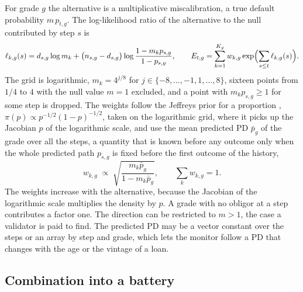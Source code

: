 For grade $g$ the alternative is a multiplicative miscalibration, a true default probability $m\,p_{t,g}$. The log-likelihood ratio of the alternative to the null contributed by step $s$ is
\begin{equation}
\ell_{k,g}(s)=d_{s,g}\log m_k+\bigl(n_{s,g}-d_{s,g}\bigr)\log\frac{1-m_kp_{s,g}}{1-p_{s,g}},\qquad E_{t,g}=\sum_{k=1}^{K_g}w_{k,g}\exp\Bigl(\sum_{s\le t}\ell_{k,g}(s)\Bigr).
\label{eq:pd-lr}
\end{equation}
The grid is logarithmic, $m_k=4^{j/8}$ for $j\in\{-8,\dots,-1,1,\dots,8\}$, sixteen points from $1/4$ to $4$ with the null value $m=1$ excluded, and a point with $m_kp_{s,g}\ge1$ for some step is dropped. The weights follow the Jeffreys prior for a
proportion \citep{jeffreys1946}, $\pi(p)\propto p^{-1/2}(1-p)^{-1/2}$, taken on the logarithmic grid, where it picks up the Jacobian $p$ of the logarithmic scale, and use the mean predicted PD $\bar p_g$ of the grade over all the steps, a quantity that is known before any outcome only when the whole predicted path $p_{s,g}$ is fixed before the first outcome of the history,
\begin{equation}
w_{k,g}\;\propto\;\sqrt{\frac{m_k\bar p_g}{1-m_k\bar p_g}},\qquad \sum_k w_{k,g}=1 .
\label{eq:pd-weights}
\end{equation}
The weights increase with the alternative, because the Jacobian of the logarithmic scale multiplies the density by $p$. A grade with no obligor at a step contributes a factor one. The direction can be restricted to $m>1$, the case a validator is paid to find.
The predicted PD may be a vector constant over the steps or an array by step and grade, which lets the monitor follow a PD that changes with the age or the vintage of a loan.

\subsection{Combination into a battery}
\label{sec:method-battery}

